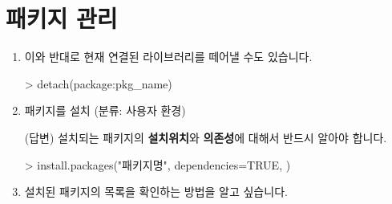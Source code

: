\section{패키지 관리}
\begin{enumerate}
\item 	이와 반대로 현재 연결된 라이브러리를 떼어낼 수도 있습니다. 

	\begin{Schunk}
	\begin{Soutput}
	> detach(package:pkg_name)	
	\end{Soutput}
	\end{Schunk}


	\item 패키지를 설치 (분류: 사용자 환경)  
	
	\textsf{(답변)} 설치되는 패키지의 \textbf{설치위치}와 \textbf{의존성}에 대해서 반드시 알아야 합니다. 
	
	\begin{Schunk}
	\begin{Soutput}
	> install.packages("패키지명", dependencies=TRUE, )
	\end{Soutput}
	\end{Schunk}

	\item 설치된 패키지의 목록을 확인하는 방법을 알고 싶습니다.
\end{enumerate}


